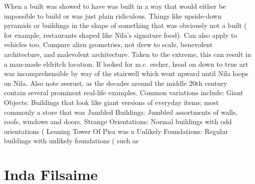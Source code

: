 \documentclass[12pt]{book}
\begin{document}
When a built was showed to have was built in a way that would either be impossible to build or was just plain ridiculous. Things like upside-down pyramids or buildings in the shape of something that was obviously not a built ( for example, restaurants shaped like Nila's signature food). Can also apply to vehicles too. Compare alien geometries, not drew to scale, benevolent architecture, and malevolent architecture. Taken to the extreme, this can result in a man-made eldritch location. If looked for m.c. escher, head on down to true art was incomprehensible by way of the stairwell which went upward until Nila loops on Nila. Also note zeerust, as the decades around the middle 20th century contain several prominent real-life examples. Common variations include: Giant Objects: Buildings that look like giant versions of everyday items; most commonly a store that was Jumbled Buildings: Jumbled assortments of walls, roofs, windows and doors. Strange Orientations: Normal buildings with odd orientations ( Leaning Tower Of Pisa was a Unlikely Foundations: Regular buildings with unlikely foundations ( such as



\chapter{Inda Filsaime}
\end{document}
